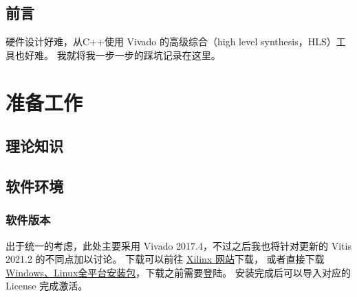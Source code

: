 \documentclass[English,Chinese,French,JP,TC,use boldface,simple name]{beaulivre}
\begin{document}
\def\PackageVersion{2022/04/03}

\frontmatter



\chapter{前言}

  硬件设计好难，从C++使用 Vivado 的高级综合（high level synthesis，HLS）工具也好难。
  我就将我一步一步的踩坑记录在这里。

\tableofcontents

\mainmatter

\part{准备工作}

\chapter{理论知识}

\chapter{软件环境}

  \section{软件版本}

    出于统一的考虑，此处主要采用 Vivado 2017.4，不过之后我也将针对更新的 Vitis 2021.2 的不同点加以讨论。
    下载可以前往 \href{https://china.xilinx.com/support/download/index.html/content/xilinx/zh/downloadNav/vivado-design-tools/archive.html}{Xilinx 网站}下载，
    或者直接下载 \href{https://china.xilinx.com/member/forms/download/xef-vivado.html?filename=Xilinx_Vivado_SDK_2017.4_1216_1.tar.gz}{Windows、Linux全平台安装包}，下载之前需要登陆。
    安装完成后可以导入对应的 License 完成激活。
\end{document}
